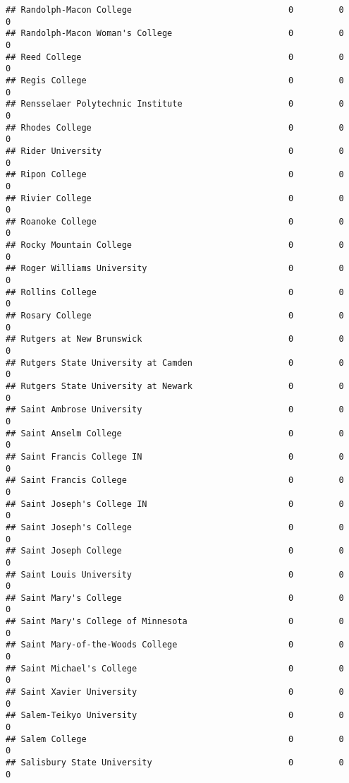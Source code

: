 \documentclass[
]{article}
\begin{document}
\begin{verbatim}
## Randolph-Macon College                               0         0           0
## Randolph-Macon Woman's College                       0         0           0
## Reed College                                         0         0           0
## Regis College                                        0         0           0
## Rensselaer Polytechnic Institute                     0         0           0
## Rhodes College                                       0         0           0
## Rider University                                     0         0           0
## Ripon College                                        0         0           0
## Rivier College                                       0         0           0
## Roanoke College                                      0         0           0
## Rocky Mountain College                               0         0           0
## Roger Williams University                            0         0           0
## Rollins College                                      0         0           0
## Rosary College                                       0         0           0
## Rutgers at New Brunswick                             0         0           0
## Rutgers State University at Camden                   0         0           0
## Rutgers State University at Newark                   0         0           0
## Saint Ambrose University                             0         0           0
## Saint Anselm College                                 0         0           0
## Saint Francis College IN                             0         0           0
## Saint Francis College                                0         0           0
## Saint Joseph's College IN                            0         0           0
## Saint Joseph's College                               0         0           0
## Saint Joseph College                                 0         0           0
## Saint Louis University                               0         0           0
## Saint Mary's College                                 0         0           0
## Saint Mary's College of Minnesota                    0         0           0
## Saint Mary-of-the-Woods College                      0         0           0
## Saint Michael's College                              0         0           0
## Saint Xavier University                              0         0           0
## Salem-Teikyo University                              0         0           0
## Salem College                                        0         0           0
## Salisbury State University                           0         0           0

\end{verbatim}
\end{document}
